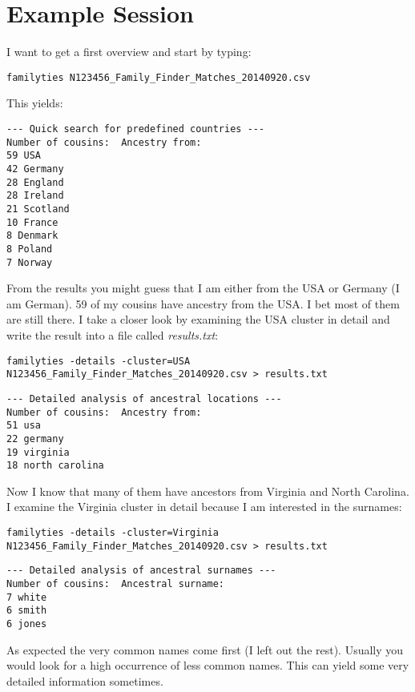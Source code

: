 \documentclass[12pt,a4paper]{article}
\begin{document}
\section{Example Session}

I want to get a first overview and start by typing:

\vspace{1em}
\noindent\texttt{familyties N123456\_Family\_Finder\_Matches\_20140920.csv}

\vspace{1em}
\noindent This yields:

\begin{verbatim}
--- Quick search for predefined countries ---
Number of cousins:  Ancestry from:
59 USA
42 Germany
28 England
28 Ireland
21 Scotland
10 France
8 Denmark
8 Poland
7 Norway
\end{verbatim}

From the results you might guess that I am either from the
USA or Germany (I am German). 59 of my cousins have ancestry
from the USA. I bet most of them are still there. I take a
closer look by examining the USA cluster in detail and write
the result into a file called \emph{results.txt}:

\vspace{1em}
\noindent\texttt{familyties -details -cluster=USA \\
N123456\_Family\_Finder\_Matches\_20140920.csv > results.txt}

\begin{verbatim}
--- Detailed analysis of ancestral locations ---
Number of cousins:  Ancestry from:
51 usa
22 germany
19 virginia
18 north carolina
\end{verbatim}

Now I know that many of them have ancestors from Virginia
and North Carolina. I examine the Virginia cluster in detail
because I am interested in the surnames:

\vspace{1em}
\noindent\texttt{familyties -details -cluster=Virginia \\
N123456\_Family\_Finder\_Matches\_20140920.csv > results.txt}

\begin{verbatim}
--- Detailed analysis of ancestral surnames ---
Number of cousins:  Ancestral surname:
7 white
6 smith
6 jones
\end{verbatim}

As expected the very common names come first (I left out
the rest). Usually you would look for a high occurrence
of less common names. This can yield some very detailed
information sometimes. 
\end{document}
